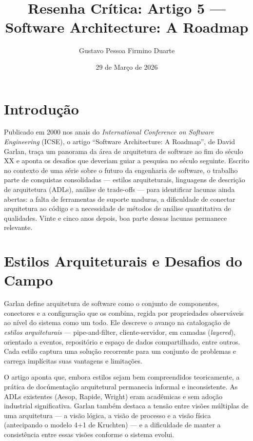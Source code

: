 \documentclass[12pt,a4paper]{article}
\title{Resenha Cr\'itica: Artigo 5 ---\\
Software Architecture: A Roadmap}
\author{Gustavo Pessoa Firmino Duarte}
\date{29 de Mar\c{c}o de 2026}
\begin{document}
\maketitle

\section{Introdu\c{c}\~ao}

Publicado em 2000 nos anais do \textit{International Conference on Software
Engineering} (ICSE), o artigo ``Software Architecture: A Roadmap'', de David
Garlan, tra\c{c}a um panorama da \'area de arquitetura de software ao fim do
s\'eculo XX e aponta os desafios que deveriam guiar a pesquisa no s\'eculo
seguinte. Escrito no contexto de uma s\'erie sobre o futuro da engenharia de
software, o trabalho parte de conquistas consolidadas --- estilos arquiteturais,
linguagens de descri\c{c}\~ao de arquitetura (ADLs), an\'alise de trade-offs ---
para identificar lacunas ainda abertas: a falta de ferramentas de suporte
maduras, a dificuldade de conectar arquitetura ao c\'odigo e a necessidade de
m\'etodos de an\'alise quantitativa de qualidades. Vinte e cinco anos depois,
boa parte dessas lacunas permanece relevante.

\section{Estilos Arquiteturais e Desafios do Campo}

Garlan define arquitetura de software como o conjunto de componentes, conectores
e a configura\c{c}\~ao que os combina, regida por propriedades observ\'aveis ao
n\'ivel do sistema como um todo. Ele descreve o avanço na cataloga\c{c}\~ao de
\textit{estilos arquiteturais} --- pipe-and-filter, cliente-servidor, em camadas
(\textit{layered}), orientado a eventos, reposit\'orio e espa\c{c}o de dados
compartilhado, entre outros. Cada estilo captura uma solu\c{c}\~ao recorrente
para um conjunto de problemas e carrega impl\'icitas suas vantagens e limitações.

O artigo aponta que, embora estilos sejam bem compreendidos teoricamente, a
pr\'atica de doc\'umenta\c{c}\~ao arquitetural permanecia informal e inconsistente.
As ADLs existentes (Aesop, Rapide, Wright) eram acad\^emicas e sem ado\c{c}\~ao
industrial significativa. Garlan tamb\'em destaca a tens\~ao entre vis\~oes
m\'ultiplas de uma arquitetura --- a vis\~ao l\'ogica, a vis\~ao de processo e a
vis\~ao f\'isica (antecipando o modelo 4+1 de Kruchten) --- e a dificuldade de
manter a consist\^encia entre essas vis\~oes conforme o sistema evolui.
\end{document}
